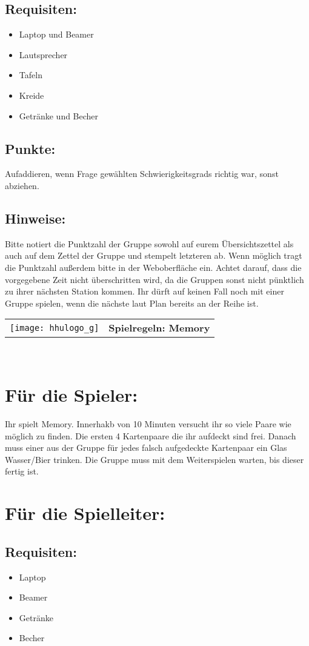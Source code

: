 \documentclass[a4paper,10pt]{article}
\def\spielg{Memory}
\newcommand{\unten}{
 Bitte notiert die Punktzahl der Gruppe sowohl auf eurem Übersichtszettel als auch auf dem Zettel der Gruppe und stempelt letzteren ab. Wenn möglich tragt die Punktzahl außerdem bitte in der Weboberfläche ein.
 Achtet darauf, dass die vorgegebene Zeit nicht überschritten wird, da die Gruppen sonst nicht pünktlich zu ihrer nächsten Station kommen. Ihr dürft auf keinen Fall noch mit einer Gruppe spielen, wenn die nächste laut Plan bereits an der Reihe ist.
}
\begin{document}
\subsection*{Requisiten:} 
\begin{itemize}
 \item Laptop und Beamer
 \item Lautsprecher
 \item Tafeln
 \item Kreide
 \item Getränke und Becher
\end{itemize}

\subsection*{Punkte:}
Aufaddieren, wenn Frage gewählten Schwierigkeitsgrads richtig war, sonst abziehen.
\subsection*{Hinweise:}
\unten

\newpage


  \begin{tabularx}{\textwidth}{lc}
    \texttt{[image: hhulogo\_g]}
  & {\Huge \textbf{Spielregeln: \spielg}}
  \end{tabularx}\\

\Large
\section*{Für die Spieler:}
Ihr spielt Memory. Innerhakb von 10 Minuten versucht ihr so viele Paare wie möglich zu finden. Die ersten 4 Kartenpaare die ihr aufdeckt sind frei. Danach muss einer aus der Gruppe für jedes falsch aufgedeckte Kartenpaar ein Glas Wasser/Bier trinken. Die Gruppe muss mit dem Weiterspielen warten, bis dieser fertig ist.

\section*{Für die Spielleiter:}
\subsection*{Requisiten:} 
\begin{itemize}
 \item Laptop
 \item Beamer
 \item Getränke
 \item Becher
\end{itemize}
\end{document}
